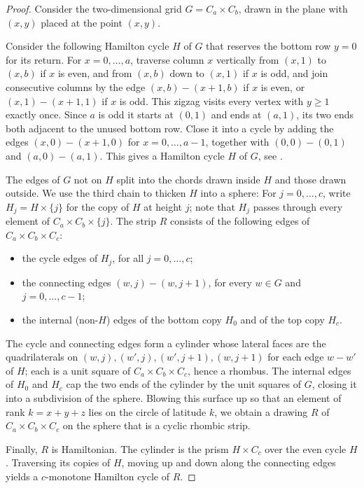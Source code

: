 \documentclass[fontsize=11pt,a4paper,DIV=12]{scrartcl}
\begin{document}
\begin{proof}
Consider the two-dimensional grid $G = C_a \times C_b$, drawn in the plane with
$(x,y)$ placed at the point $(x,y)$.

Consider the following Hamilton cycle $H$ of $G$ that reserves the bottom row $y = 0$ for its
return. For $x = 0, \dots, a$, traverse column $x$ vertically from $(x,1)$ to
$(x,b)$ if $x$ is even, and from $(x,b)$ down to $(x,1)$ if $x$ is odd, and join
consecutive columns by the edge $(x,b) - (x+1,b)$ if $x$ is even, or
$(x,1) - (x{+}1,1)$ if $x$ is odd. This zigzag visits every vertex with $y \geq 1$
exactly once. Since $a$ is odd it starts at $(0,1)$ and ends at $(a,1)$, its two ends
both adjacent to the unused bottom row. Close it into a cycle by adding the
edges $(x,0) - (x{+}1,0)$ for $x = 0, \dots, a-1$, together with $(0,0) - (0,1)$ and
$(a,0) - (a,1)$. This gives a Hamilton cycle $H$ of $G$, see .

The edges of $G$ not on $H$ split into the chords drawn inside $H$ and those drawn
outside. We use the third chain to thicken $H$ into a sphere: For $j = 0, \dots, c$, write
$H_j = H \times \{j\}$ for the copy of $H$ at height $j$; note that $H_j$ passes
through every element of $C_a \times C_b \times \{j\}$. The strip $R$ consists of the
following edges of $C_a \times C_b \times C_c$:
\begin{itemize}
    \item the cycle edges of $H_j$, for all $j = 0, \dots, c$;
    \item the connecting edges $(w,j) - (w,j+1)$, for every $w \in G$ and
        $j = 0, \dots, c-1$;
    \item the internal (non-$H$) edges of the bottom copy $H_0$ and of the top copy
        $H_c$.
\end{itemize}

The cycle and connecting edges form a cylinder whose lateral faces are the
quadrilaterals on $(w,j), (w',j), (w',j+1), (w,j+1)$ for each edge $w-w'$ of $H$;
each is a unit square of $C_a \times C_b \times C_c$, hence a rhombus. The internal
edges of $H_0$ and $H_c$ cap the two ends of the cylinder by the unit squares of $G$,
closing it into a subdivision of the sphere. Blowing this surface up so that an
element of rank $k = x+y+z$ lies on the circle of latitude $k$, we obtain a drawing
$R$ of $C_a \times C_b \times C_c$ on the sphere that is a cyclic rhombic strip.

Finally, $R$ is Hamiltonian. The cylinder is the prism $H \times C_c$ over the even
cycle $H$. Traversing its copies of $H$, moving up and
down along the connecting edges yields a $c$-monotone Hamilton cycle of $R$.
\end{proof}
\end{document}
